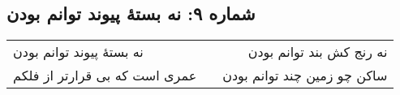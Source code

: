 \begin{center}
\section*{شماره ۹: نه بستۀ پیوند توانم بودن}
\label{sec:009}
\begin{longtable}{l p{0.5cm} r}
نه بستهٔ پیوند توانم بودن
&&
نه رنج کش بند توانم بودن
\\
عمری است که بی قرارتر از فلکم
&&
ساکن چو زمین چند توانم بودن
\\
\end{longtable}
\end{center}
